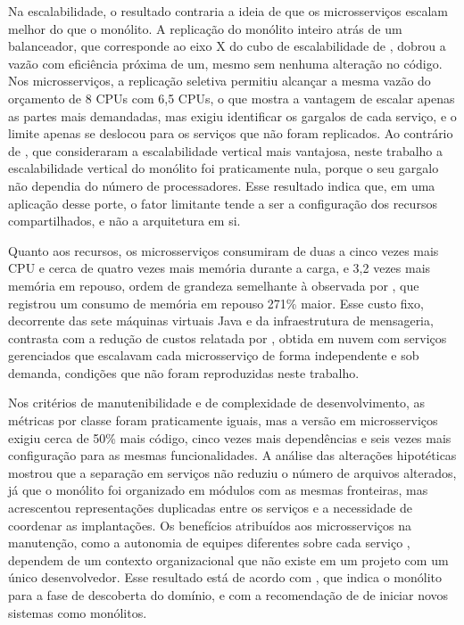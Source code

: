 Na escalabilidade, o resultado contraria a ideia de que os microsserviços escalam melhor do que
o monólito. A replicação do monólito inteiro atrás de um balanceador, que corresponde ao eixo X
do cubo de escalabilidade de , dobrou a vazão com eficiência próxima de
um, mesmo sem nenhuma alteração no código. Nos microsserviços, a replicação seletiva permitiu
alcançar a mesma vazão do orçamento de 8 CPUs com 6,5 CPUs, o que mostra a vantagem de escalar
apenas as partes mais demandadas, mas exigiu identificar os gargalos de cada serviço, e o limite
apenas se deslocou para os serviços que não foram replicados. Ao contrário de
, que consideraram a escalabilidade vertical mais vantajosa, neste
trabalho a escalabilidade vertical do monólito foi praticamente nula, porque o seu gargalo não
dependia do número de processadores. Esse resultado indica que, em uma aplicação desse porte,
o fator limitante tende a ser a configuração dos recursos compartilhados, e não a arquitetura
em si.

Quanto aos recursos, os microsserviços consumiram de duas a cinco vezes mais CPU e cerca de
quatro vezes mais memória durante a carga, e 3,2 vezes mais memória em repouso, ordem de
grandeza semelhante à observada por , que registrou um consumo de memória em
repouso 271\% maior. Esse custo fixo, decorrente das sete máquinas virtuais Java e da
infraestrutura de mensageria, contrasta com a redução de custos relatada por
, obtida em nuvem com serviços gerenciados que escalavam cada
microsserviço de forma independente e sob demanda, condições que não foram reproduzidas neste
trabalho.

Nos critérios de manutenibilidade e de complexidade de desenvolvimento, as métricas por classe
foram praticamente iguais, mas a versão em microsserviços exigiu cerca de 50\% mais código,
cinco vezes mais dependências e seis vezes mais configuração para as mesmas funcionalidades. A
análise das alterações hipotéticas mostrou que a separação em serviços não reduziu o número de
arquivos alterados, já que o monólito foi organizado em módulos com as mesmas fronteiras, mas
acrescentou representações duplicadas entre os serviços e a necessidade de coordenar as
implantações. Os benefícios atribuídos aos microsserviços na manutenção, como a autonomia de
equipes diferentes sobre cada serviço \cite{newman2021}, dependem de um contexto organizacional
que não existe em um projeto com um único desenvolvedor. Esse resultado está de acordo com
, que indica o monólito para a fase de descoberta do domínio, e com a
recomendação de  de iniciar novos sistemas como monólitos.

